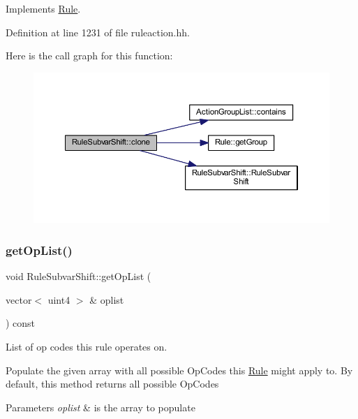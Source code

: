 Implements \mbox{\hyperlink{class_rule_a70de90a76461bfa7ea0b575ce3c11e4d}{Rule}}.



Definition at line 1231 of file ruleaction.\+hh.

Here is the call graph for this function\+:
\nopagebreak
\begin{figure}[H]
\begin{center}
\leavevmode
\includegraphics[width=350pt]{class_rule_subvar_shift_ad278c6c03817d7e98c0b7cb06b49bd53_cgraph}
\end{center}
\end{figure}
\mbox{\label{class_rule_subvar_shift_aadc6bfd270eec1e36456a22308231f84}} 
\subsubsection{\texorpdfstring{getOpList()}{getOpList()}}
{\footnotesize\ttfamily void Rule\+Subvar\+Shift\+::get\+Op\+List (\begin{DoxyParamCaption}\item[{vector$<$ uint4 $>$ \&}]{oplist }\end{DoxyParamCaption}) const\hspace{0.3cm}{\ttfamily [virtual]}}



List of op codes this rule operates on. 

Populate the given array with all possible Op\+Codes this \mbox{\hyperlink{class_rule}{Rule}} might apply to. By default, this method returns all possible Op\+Codes 
\begin{DoxyParams}{Parameters}
{\em oplist} & is the array to populate \\
\hline
\end{DoxyParams}



